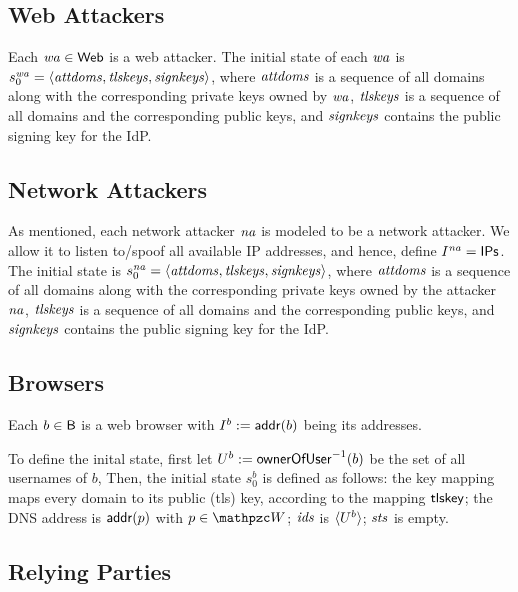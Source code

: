 \documentclass[letterpaper,onecolumn,10pt]{article}
\begin{document}
\subsection{Web Attackers}\label{app:webattackers-uppresso}
Each $\mathit{wa} \in \mathsf{Web}$ is a web attacker. 
The initial state of each $\mathit{wa}$ is 
$s_0^{\mathit{wa}} = \langle\mathit{attdoms}, \mathit{tlskeys}, \mathit{signkeys}\rangle$, 
where $\mathit{attdoms}$ is a sequence of all domains along with 
the corresponding private keys owned by $\mathit{wa}$, 
$\mathit{tlskeys}$ is a sequence of all domains and 
the corresponding public keys, and 
$\mathit{signkeys}$ contains the public signing key for the IdP. 

\subsection{Network Attackers}\label{app:networkattackers-uppresso}
As mentioned, each network attacker $\mathit{na}$ is modeled to 
be a network attacker. We allow it to listen to/spoof all 
available IP addresses, and hence, define 
$I^{\mathit{na}} = \mathsf{IPs}$. 
The initial state is $s_0^{\mathit{na}} = 
\langle\mathit{attdoms}, \mathit{tlskeys}, \mathit{signkeys}\rangle$, 
where $\mathit{attdoms}$ is a sequence of all domains along with 
the corresponding private keys owned by the attacker 
$\mathit{na}$, $\mathit{tlskeys}$ is a sequence of all domains 
and the corresponding public keys, and 
$\mathit{signkeys}$ contains the public signing key for the IdP. 

\subsection{Browsers}\label{app:browsers-uppresso} 
Each $b \in \mathsf{B}$ is a web browser with 
$I^b := \mathsf{addr}(b)$ being its addresses.

To define the inital state, first let $U^b := 
\mathsf{ownerOfUser}^{-1}(b)$ be the set of all usernames of $b$, 
Then, the initial state $s_0^b$ is defined as follows: the key mapping
maps every domain to its public (tls) key, according to the mapping
$\mathsf{tlskey}$; the DNS address is $\mathsf{addr}(p)$ with $p \in \bidsystem$;
$\mathit{ids}$ is $\langle U^b\rangle$; $\mathit{sts}$ is empty.

\subsection{Relying Parties} \label{app:relying-parties-uppresso}
\end{document}
